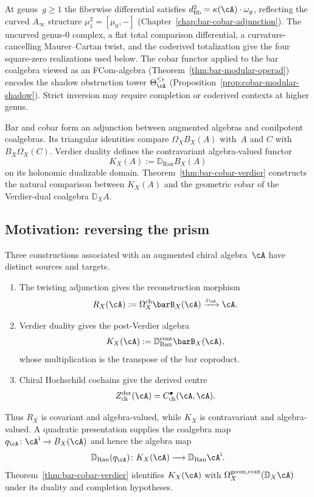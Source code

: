 At genus~$g \geq 1$ the fiberwise differential satisfies
$d_{\mathrm{fib}}^2 = \kappa(\cA) \cdot \omega_g$, reflecting the curved
$A_\infty$ structure $\mu_1^2 = [\mu_0, -]$
(Chapter~\ref{chap:bar-cobar-adjunction}). The uncurved genus-$0$
complex, a flat total comparison differential, a curvature-cancelling
Maurer--Cartan twist, and the coderived totalization give the four
square-zero realizations used below. The cobar functor
applied to the bar coalgebra viewed as an FCom-algebra
(Theorem~\ref{thm:bar-modular-operad}) encodes the shadow
obstruction tower $\Theta_\cA^{\leq r}$
(Proposition~\ref{prop:cobar-modular-shadow}).
Strict inversion may require completion or coderived contexts
at higher genus.

Bar and cobar form an adjunction between augmented algebras and
conilpotent coalgebras. Its triangular identities compare
$\Omega_XB_X(A)$ with~$A$ and $C$ with $B_X\Omega_X(C)$. Verdier
duality defines the contravariant algebra-valued functor
\[
K_X(A):=\mathbb D_{\operatorname{Ran}}B_X(A)
\]
on its holonomic dualizable domain. Theorem~\ref{thm:bar-cobar-verdier}
constructs the natural comparison between $K_X(A)$ and the geometric
cobar of the Verdier-dual coalgebra $\mathbb D_XA$.

\subsection{Motivation: reversing the prism}

\begin{remark}
\label{rem:cobar-three-functors}
Three constructions associated with an augmented chiral algebra~$\cA$
have distinct sources and targets.
\begin{enumerate}[label=\textup{(\roman*)}]
\item The twisting adjunction gives the reconstruction morphism
\[
R_X(\cA):=\Omegach_X\barB_X(\cA)
\xrightarrow{\varepsilon_\cA}\cA .
\]
\item Verdier duality gives the post-Verdier algebra
\[
K_X(\cA):=\mathbb D_{\operatorname{Ran}}^{\mathrm{cont}}
\barB_X(\cA),
\]
whose multiplication is the transpose of the bar coproduct.
\item Chiral Hochschild cochains give the derived centre
\[
Z^{\mathrm{der}}_{\mathrm{ch}}(\cA)
=C^\bullet_{\mathrm{ch}}(\cA,\cA).
\]
\end{enumerate}
Thus $R_X$ is covariant and algebra-valued, while $K_X$ is
contravariant and algebra-valued. A quadratic presentation supplies
the coalgebra map $q_\cA\colon\cA^{\mathrm i}\to B_X(\cA)$ and hence
the algebra map
\[
\mathbb D_{\operatorname{Ran}}(q_\cA)\colon
K_X(\cA)\longrightarrow\mathbb D_{\operatorname{Ran}}\cA^{\mathrm i}.
\]
Theorem~\ref{thm:bar-cobar-verdier} identifies $K_X(\cA)$ with
$\Omega_X^{\mathrm{geom,cont}}(\mathbb D_X\cA)$ under its duality and
completion hypotheses.
\end{remark}

